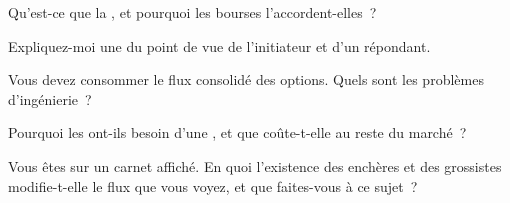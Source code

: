 \begin{interviewq}\label{iq:m1:options-market-structure:2}
Qu'est-ce que la , et pourquoi les bourses l'accordent-elles~?
\end{interviewq}

\begin{interviewq}\label{iq:m1:options-market-structure:3}
Expliquez-moi une  du point de vue
de l'initiateur et d'un répondant.
\end{interviewq}

\begin{interviewq}\label{iq:m1:options-market-structure:4}
Vous devez consommer le flux consolidé des options. Quels sont les
problèmes d'ingénierie~?
\end{interviewq}

\begin{interviewq}\label{iq:m1:options-market-structure:5}
Pourquoi les  ont-ils besoin d'une , et que coûte-t-elle au reste du marché~?
\end{interviewq}

\begin{interviewq}\label{iq:m1:options-market-structure:6}
Vous êtes  sur un carnet affiché. En quoi
l'existence des enchères et des grossistes modifie-t-elle le flux que vous voyez, et
que faites-vous à ce sujet~?
\end{interviewq}
